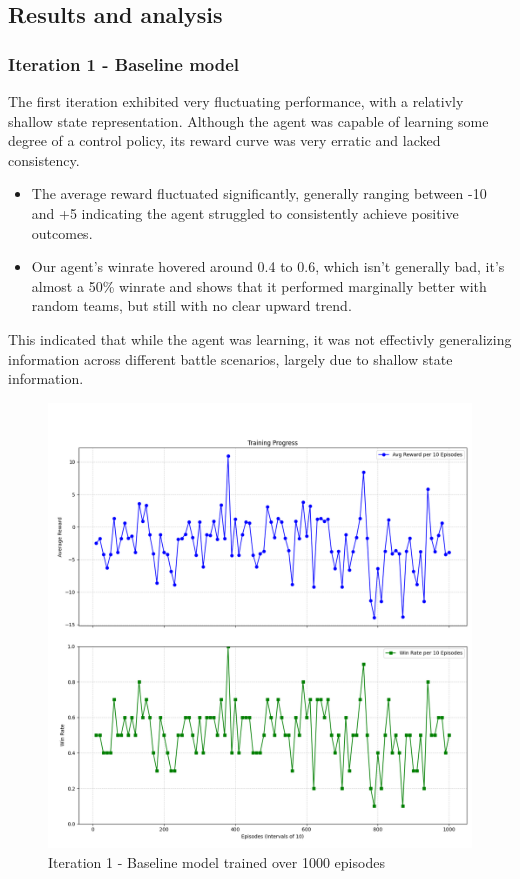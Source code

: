 \subsection{Results and analysis}
\subsubsection{Iteration 1 - Baseline model}
The first iteration exhibited very fluctuating performance, with a relativly shallow
state representation. Although the agent was capable of learning some degree of a control
policy, its reward curve was very erratic and lacked consistency.
\begin{itemize}
    \item The average reward fluctuated significantly, generally ranging between -10 and +5
          indicating the agent struggled to consistently achieve positive outcomes.
    \item Our agent's winrate hovered around 0.4 to 0.6, which isn't generally bad, it's almost a 50\% winrate
          and shows that it performed marginally better with random teams, but still with no clear upward trend.
\end{itemize}
This indicated that while the agent was learning, it was not effectivly generalizing
information across different battle scenarios, largely due to shallow state information.

\begin{figure}[H]
    \centering
    \includegraphics[width=\textwidth]{assets/Iteration-1-graphs.png}
    \caption{Iteration 1 - Baseline model trained over 1000 episodes}
    \label{fig:iteration-1-graphs}
\end{figure}

